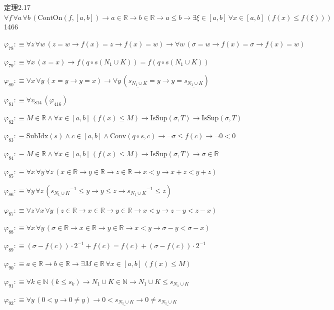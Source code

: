 \begin{fullproof}{定理2.17}{$\forall f\,\forall a\,\forall b\,(\mathrm{ContOn}(f,[a,b]) \to a \in \mathbb{R} \to b \in \mathbb{R} \to a \leq b \to \exists \xi \in [a,b]\,\forall x \in [a,b]\,(f(x) \leq f(\xi)))$}{1466}
\begin{abbrevlist}
\item $\varphi_{78} :\equiv \forall z\,\forall w\,(z = w \to f(x) = z \to f(x) = w) \to \forall w\,(\sigma = w \to f(x) = \sigma \to f(x) = w)$
\item $\varphi_{79} :\equiv \forall x\,(x = x) \to f(q \circ s(N_{1} \cup K)) = f(q \circ s(N_{1} \cup K))$
\item $\varphi_{80} :\equiv \forall x\,\forall y\,(x = y \to y = x) \to \forall y\,(\underline{s_{N_{1} \cup K}} = y \to y = \underline{s_{N_{1} \cup K}})$
\item $\varphi_{81} :\equiv \forall v_{814}\,(\varphi_{416})$
\item $\varphi_{82} :\equiv M \in \mathbb{R} \land \forall x \in [a,b]\,(f(x) \leq M) \to \mathrm{IsSup}(\sigma,T) \to \mathrm{IsSup}(\sigma,T)$
\item $\varphi_{83} :\equiv \mathrm{SubIdx}(s) \land c \in [a,b] \land \mathrm{Conv}(q \circ s,c) \to \neg \sigma \leq f(c) \to \neg 0 < 0$
\item $\varphi_{84} :\equiv M \in \mathbb{R} \land \forall x \in [a,b]\,(f(x) \leq M) \to \mathrm{IsSup}(\sigma,T) \to \sigma \in \mathbb{R}$
\item $\varphi_{85} :\equiv \forall x\,\forall y\,\forall z\,(x \in \mathbb{R} \to y \in \mathbb{R} \to z \in \mathbb{R} \to x < y \to x + z < y + z)$
\item $\varphi_{86} :\equiv \forall y\,\forall z\,(\underline{s_{N_{1} \cup K}}^{-1} \leq y \to y \leq z \to \underline{s_{N_{1} \cup K}}^{-1} \leq z)$
\item $\varphi_{87} :\equiv \forall z\,\forall x\,\forall y\,(z \in \mathbb{R} \to x \in \mathbb{R} \to y \in \mathbb{R} \to x < y \to z - y < z - x)$
\item $\varphi_{88} :\equiv \forall x\,\forall y\,(\sigma \in \mathbb{R} \to x \in \mathbb{R} \to y \in \mathbb{R} \to x < y \to \sigma - y < \sigma - x)$
\item $\varphi_{89} :\equiv (\sigma - f(c)) \cdot 2^{-1} + f(c) = f(c) + (\sigma - f(c)) \cdot 2^{-1}$
\item $\varphi_{90} :\equiv a \in \mathbb{R} \to b \in \mathbb{R} \to \exists M \in \mathbb{R}\,\forall x \in [a,b]\,(f(x) \leq M)$
\item $\varphi_{91} :\equiv \forall k \in \mathbb{N}\,(k \leq s_{k}) \to N_{1} \cup K \in \mathbb{N} \to N_{1} \cup K \leq s_{N_{1} \cup K}$
\item $\varphi_{92} :\equiv \forall y\,(0 < y \to 0 \neq y) \to 0 < \underline{s_{N_{1} \cup K}} \to 0 \neq \underline{s_{N_{1} \cup K}}$

\end{abbrevlist}
\end{fullproof}
